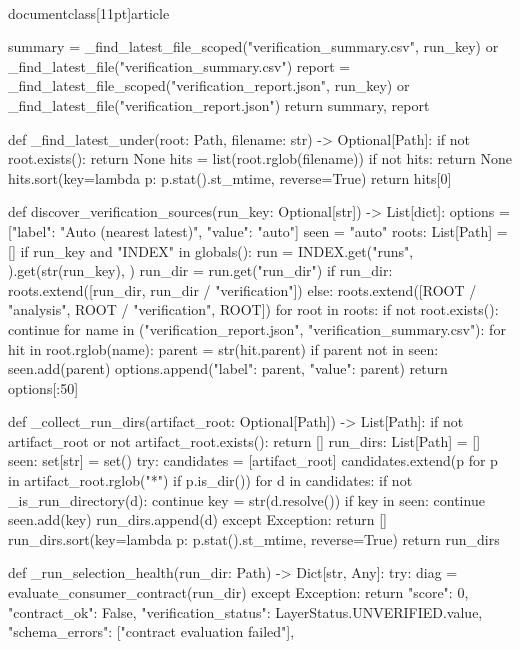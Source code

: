 \\documentclass[11pt]{article}
\begin{document}
\begin{CodeBlock}
{    summary = _find_latest_file_scoped("verification_summary.csv", run_key) or _find_latest_file("verification_summary.csv")
    report = _find_latest_file_scoped("verification_report.json", run_key) or _find_latest_file("verification_report.json")
    return summary, report


def _find_latest_under(root: Path, filename: str) -> Optional[Path]:
    if not root.exists():
        return None
    hits = list(root.rglob(filename))
    if not hits:
        return None
    hits.sort(key=lambda p: p.stat().st_mtime, reverse=True)
    return hits[0]


def discover_verification_sources(run_key: Optional[str]) -> List[dict]:
    options = [{"label": "Auto (nearest latest)", "value": "auto"}]
    seen = {"auto"}
    roots: List[Path] = []
    if run_key and "INDEX" in globals():
        run = INDEX.get("runs", {}).get(str(run_key), {})
        run_dir = run.get("run_dir")
        if run_dir:
            roots.extend([run_dir, run_dir / "verification"])
    else:
        roots.extend([ROOT / "analysis", ROOT / "verification", ROOT])
    for root in roots:
        if not root.exists():
            continue
        for name in ("verification_report.json", "verification_summary.csv"):
            for hit in root.rglob(name):
                parent = str(hit.parent)
                if parent not in seen:
                    seen.add(parent)
                    options.append({"label": parent, "value": parent})
    return options[:50]


def _collect_run_dirs(artifact_root: Optional[Path]) -> List[Path]:
    if not artifact_root or not artifact_root.exists():
        return []
    run_dirs: List[Path] = []
    seen: set[str] = set()
    try:
        candidates = [artifact_root]
        candidates.extend(p for p in artifact_root.rglob("*") if p.is_dir())
        for d in candidates:
            if not _is_run_directory(d):
                continue
            key = str(d.resolve())
            if key in seen:
                continue
            seen.add(key)
            run_dirs.append(d)
    except Exception:
        return []
    run_dirs.sort(key=lambda p: p.stat().st_mtime, reverse=True)
    return run_dirs


def _run_selection_health(run_dir: Path) -> Dict[str, Any]:
    try:
        diag = evaluate_consumer_contract(run_dir)
    except Exception:
        return {
            "score": 0,
            "contract_ok": False,
            "verification_status": LayerStatus.UNVERIFIED.value,
            "schema_errors": ["contract evaluation failed"],
        }

}
\end{CodeBlock}
\end{document}

